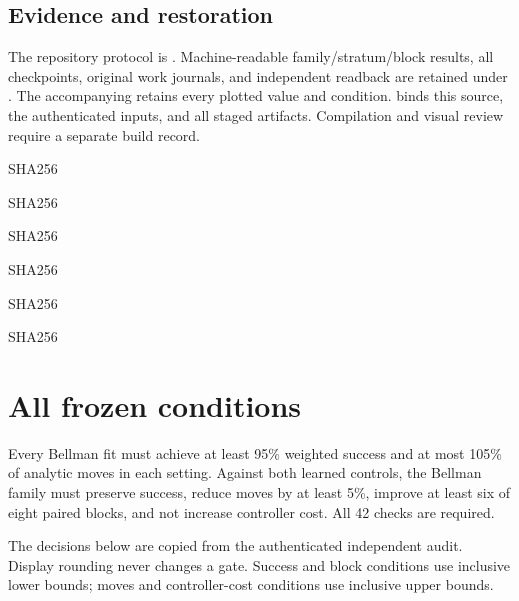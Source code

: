 \documentclass[10pt]{article}
\begin{document}
\subsection*{Evidence and restoration}
The repository protocol is . Machine-readable family/stratum/block results, all checkpoints, original work journals, and independent readback are retained under . The accompanying  retains every plotted value and condition.  binds this source, the authenticated inputs, and all staged artifacts. Compilation and visual review require a separate build record.\par
{\footnotesize\begin{description}\par
\item[plan] SHA256 
\item[terminal] SHA256 
\item[worker] SHA256 
\item[audit] SHA256 
\item[audit\_summary] SHA256 
\item[worker\_summary] SHA256 
\end{description}}\clearpage\appendix\section{All frozen conditions}
Every Bellman fit must achieve at least 95\% weighted success and at most 105\% of analytic moves in each setting. Against both learned controls, the Bellman family must preserve success, reduce moves by at least 5\%, improve at least six of eight paired blocks, and not increase controller cost. All 42 checks are required.\par
The decisions below are copied from the authenticated independent audit. Display rounding never changes a gate. Success and block conditions use inclusive lower bounds; moves and controller-cost conditions use inclusive upper bounds.\par
\end{document}
